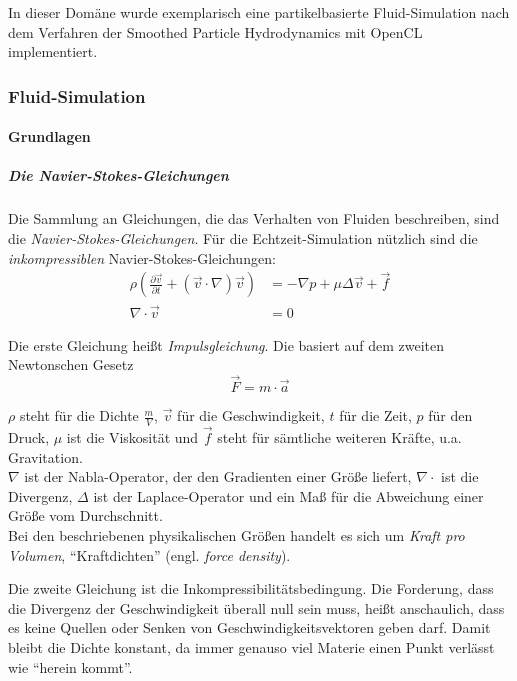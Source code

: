 

\label{sec:mechanicalDomain}
In dieser Domäne wurde exemplarisch eine partikelbasierte Fluid-Simulation nach dem
Verfahren der Smoothed Particle Hydrodynamics mit OpenCL implementiert.
	
\subsubsection{Fluid-Simulation}
		
	\paragraph{Grundlagen}
		
		\subparagraph{Die Navier-Stokes-Gleichungen}
		Die Sammlung an Gleichungen, die das Verhalten von Fluiden beschreiben, sind die
		\emph{Navier-Stokes-Gleichungen}.
		Für die Echtzeit-Simulation nützlich sind die \emph{inkompressiblen} Navier-Stokes-Gleichungen:
		\begin{subequations}\label{equ:navStokes1}
			\begin{align}
			\rho 
			\left( 
				\frac{\partial \vec{v}}{\partial t} 
				+ 
				\left( \vec{v} \cdot \nabla	\right) \vec{v} 
			\right)
				& = - \nabla p  + \mu \Delta \vec{v} + \vec{f} \\
			\nabla \cdot \vec{v}   & = 0
			\end{align}	
		\end{subequations}
		
		Die erste Gleichung heißt \emph{Impulsgleichung}. Die basiert auf dem zweiten Newtonschen Gesetz
		\begin{equation}
			\vec{F} = m \cdot \vec{a}
		\end{equation}
		
		$\rho$ steht für die Dichte  $\frac{m}{V}$, $\vec{v}$ für die Geschwindigkeit, $t$ für die Zeit,
		$p$ für den Druck, $\mu$ ist die Viskosität und $\vec{f}$ steht für sämtliche weiteren
		Kräfte, u.a. Gravitation.\\
		$\nabla$ ist der Nabla-Operator, der den Gradienten einer Größe liefert, 
		$\nabla \cdot$	ist die Divergenz,	
		$\Delta$ ist der Laplace-Operator und ein Maß für die Abweichung einer Größe vom Durchschnitt.\\	
		
		Bei den beschriebenen physikalischen Größen handelt es sich um \emph{Kraft pro Volumen},
		"`Kraftdichten"' (engl. \emph{force density}).
		
		Die zweite Gleichung ist die Inkompressibilitätsbedingung.
		Die Forderung, dass die Divergenz der Geschwindigkeit überall null sein muss, heißt anschaulich, dass es keine
		Quellen oder Senken von Geschwindigkeitsvektoren geben darf. Damit bleibt die Dichte konstant, da immer genauso
		viel Materie einen Punkt verlässt wie "`herein kommt"'.\\

